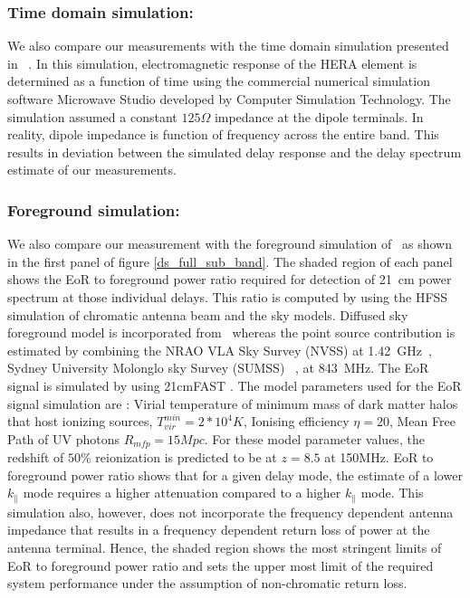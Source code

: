\documentclass[twocolumn]{emulateapj}
\begin{document}
    
    
   \subsubsection{Time domain simulation:}  
    We also compare our measurements with the time domain simulation presented in ~\cite{Ewall-Wice_et_al2016}. In this simulation, electromagnetic response of the HERA element is determined as a function of time using the commercial numerical simulation software Microwave Studio developed by Computer Simulation Technology. The simulation assumed a constant $125\Omega$ impedance at the dipole terminals. In reality, dipole impedance is function of frequency across the entire band. This results in deviation between the simulated delay response and the delay spectrum estimate of our measurements. \\
     \subsubsection{Foreground simulation:}  
    We also compare our measurement with the foreground simulation of~\citep{Thyagarajan_et_al2016} as shown in the first panel of figure \ref{ds_full_sub_band}. The shaded region of each panel shows the EoR to
    foreground power ratio required for detection of 21~cm power spectrum at those
    individual delays. This ratio is computed by
    using the HFSS simulation of chromatic antenna beam and the sky models. Diffused sky foreground model is
    incorporated from~\citep{deolivieracosta_et_al2008} whereas the point source
    contribution is estimated by combining the NRAO VLA Sky Survey (NVSS) at
    1.42~GHz~\citep{Condon_1998}, Sydney University Molonglo sky Survey (SUMSS)
    ~\citep{Bock_et_al_1999}, \citep{Mauch_et_al_2003} at 843~MHz. The EoR signal
    is simulated by using 21cmFAST \citep{Messinger_et_al2011}. The model
    parameters used for the EoR signal simulation
    are : Virial temperature of minimum mass of dark matter halos that host
    ionizing sources, $T_{vir}^{min} = 2*10^4 K$, Ionising efficiency $\eta = 20$,
    Mean Free Path of UV photons $R_{mfp} = 15Mpc.$ For these model parameter
    values, the redshift of $50\%$ reionization is predicted to be at $z = 8.5$ at
    150MHz.  
    EoR to foreground power ratio shows that for a given
    delay mode, the estimate of a lower $k_{\parallel}$ mode requires a higher
    attenuation compared to a higher $k_{\parallel}$ mode. 
     This simulation also, however, does not incorporate the frequency dependent antenna impedance that 
     results in a frequency dependent return loss of power at the antenna terminal. Hence, the shaded region shows the most      
     stringent limits of  EoR to foreground power ratio and sets the upper most limit of the required system performance under the assumption of non-chromatic return loss. 
     
\end{document}
